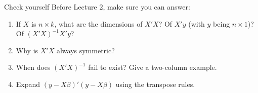 \documentclass[aspectratio=169,11pt]{beamer}
\begin{document}
\begin{frame}{Check yourself}
Before Lecture 2, make sure you can answer:
\begin{enumerate}
	\item If $X$ is $n \times k$, what are the dimensions of $X'X$? Of $X'y$ (with $y$ being $n\times 1$)? Of $(X'X)^{-1}X'y$?
	\item Why is $X'X$ always symmetric?
	\item When does $(X'X)^{-1}$ fail to exist? Give a two-column example.
	\item Expand $(y - X\beta)'(y - X\beta)$ using the transpose rules.
\end{enumerate}
\end{frame}
\end{document}
